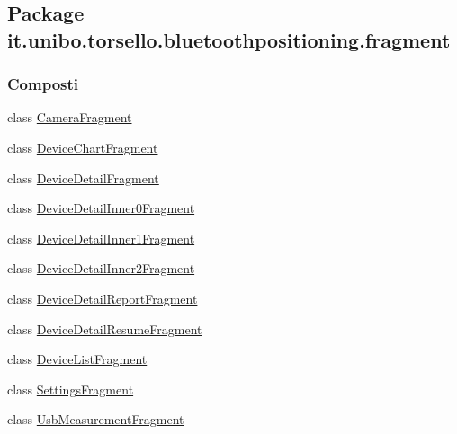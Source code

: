 \hypertarget{namespaceit_1_1unibo_1_1torsello_1_1bluetoothpositioning_1_1fragment}{}\subsection{Package it.\+unibo.\+torsello.\+bluetoothpositioning.\+fragment}
\label{namespaceit_1_1unibo_1_1torsello_1_1bluetoothpositioning_1_1fragment}
\subsubsection*{Composti}
\begin{DoxyCompactItemize}
\item 
class \hyperlink{classit_1_1unibo_1_1torsello_1_1bluetoothpositioning_1_1fragment_1_1CameraFragment}{Camera\+Fragment}
\item 
class \hyperlink{classit_1_1unibo_1_1torsello_1_1bluetoothpositioning_1_1fragment_1_1DeviceChartFragment}{Device\+Chart\+Fragment}
\item 
class \hyperlink{classit_1_1unibo_1_1torsello_1_1bluetoothpositioning_1_1fragment_1_1DeviceDetailFragment}{Device\+Detail\+Fragment}
\item 
class \hyperlink{classit_1_1unibo_1_1torsello_1_1bluetoothpositioning_1_1fragment_1_1DeviceDetailInner0Fragment}{Device\+Detail\+Inner0\+Fragment}
\item 
class \hyperlink{classit_1_1unibo_1_1torsello_1_1bluetoothpositioning_1_1fragment_1_1DeviceDetailInner1Fragment}{Device\+Detail\+Inner1\+Fragment}
\item 
class \hyperlink{classit_1_1unibo_1_1torsello_1_1bluetoothpositioning_1_1fragment_1_1DeviceDetailInner2Fragment}{Device\+Detail\+Inner2\+Fragment}
\item 
class \hyperlink{classit_1_1unibo_1_1torsello_1_1bluetoothpositioning_1_1fragment_1_1DeviceDetailReportFragment}{Device\+Detail\+Report\+Fragment}
\item 
class \hyperlink{classit_1_1unibo_1_1torsello_1_1bluetoothpositioning_1_1fragment_1_1DeviceDetailResumeFragment}{Device\+Detail\+Resume\+Fragment}
\item 
class \hyperlink{classit_1_1unibo_1_1torsello_1_1bluetoothpositioning_1_1fragment_1_1DeviceListFragment}{Device\+List\+Fragment}
\item 
class \hyperlink{classit_1_1unibo_1_1torsello_1_1bluetoothpositioning_1_1fragment_1_1SettingsFragment}{Settings\+Fragment}
\item 
class \hyperlink{classit_1_1unibo_1_1torsello_1_1bluetoothpositioning_1_1fragment_1_1UsbMeasurementFragment}{Usb\+Measurement\+Fragment}
\end{DoxyCompactItemize}

